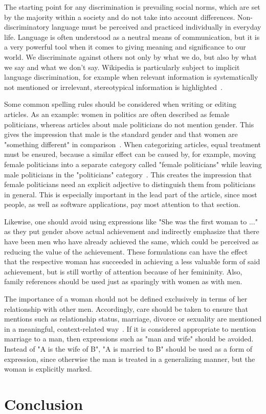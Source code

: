 \documentclass[a4paper, 11pt]{article}
\begin{document}
The starting point for any discrimination is prevailing social norms, which are set by the majority within a society and do not take into account differences. Non-discriminatory language must be perceived and practiced individually in everyday life. Language is often understood as a neutral means of communication, but it is a very powerful tool when it comes to giving meaning and significance to our world. We discriminate against others not only by what we do, but also by what we say and what we don't say. Wikipedia is particularly subject to implicit language discrimination, for example when relevant information is systematically not mentioned or irrelevant, stereotypical information is highlighted~\cite{wagner2016women}.

Some common spelling rules should be considered when writing or editing articles. As an example: women in politics are often described as female politicians, whereas articles about male politicians do not mention gender. This gives the impression that male is the standard gender and that women are "something different" in comparison~\cite{wagner2016women}. When categorizing articles, equal treatment must be ensured, because a similar effect can be caused by, for example, moving female politicians into a separate category called "female politicians" while leaving male politicians in the "politicians" category~\cite{flood2013guardian}. This creates the impression that female politicians need an explicit adjective to distinguish them from politicians in general. This is especially important in the lead part of the article, since most people, as well as software applications, pay most attention to that section.

Likewise, one should avoid using expressions like "She was the first woman to ..." as they put gender above actual achievement and indirectly emphasize that there have been men who have already achieved the same, which could be perceived as reducing the value of the achievement. These formulations can have the effect that the respective woman has succeeded in achieving a less valuable form of said achievement, but is still worthy of attention because of her femininity. Also, family references should be used just as sparingly with women as with men.

The importance of a woman should not be defined exclusively in terms of her relationship with other men. Accordingly, care should be taken to ensure that mentions such as relationship status, marriage, divorce or sexuality are mentioned in a meaningful, context-related way~\cite{graells2015first}. If it is considered appropriate to mention marriage to a man, then expressions such as "man and wife" should be avoided. Instead of "A is the wife of B", "A is married to B" should be used as a form of expression, since otherwise the man is treated in a generalizing manner, but the woman is explicitly marked.

\section{Conclusion} \label{sec:conclusion}




\doclicenseThis
\end{document}
